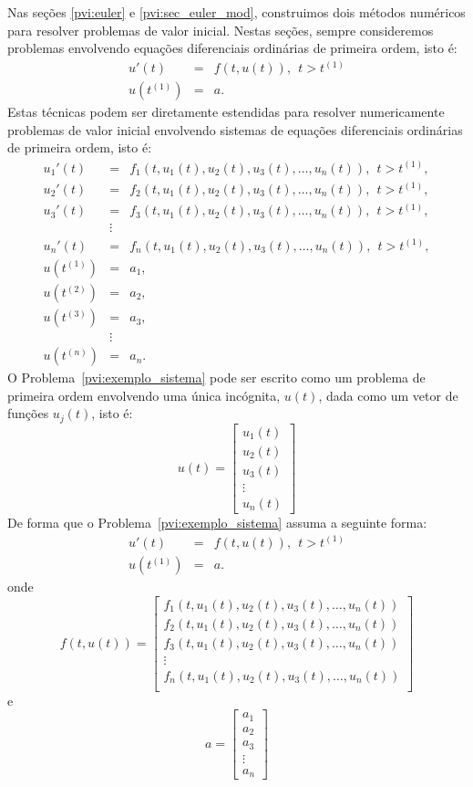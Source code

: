 Nas seções \ref{pvi:euler} e \ref{pvi:sec_euler_mod}, construimos dois métodos numéricos para resolver problemas de valor inicial. Nestas seções, sempre consideremos problemas envolvendo equações diferenciais ordinárias de primeira ordem, isto é:
\begin{eqnarray*}
  u'(t)  &=& f(t,u(t)),~~t>t^{(1)} \\
  u(t^{(1)}) &=& a.
\end{eqnarray*}
Estas técnicas podem ser diretamente estendidas para resolver numericamente problemas de valor inicial envolvendo sistemas de equações diferenciais ordinárias de primeira ordem, isto é:
\begin{eqnarray}\label{pvi:exemplo_sistema}
  u_1'(t)  &=& f_1(t,u_1(t), u_2(t), u_3(t),\ldots, u_n(t)),~~t>t^{(1)} ,\\
  u_2'(t)  &=& f_2(t,u_1(t), u_2(t), u_3(t),\ldots, u_n(t)),~~t>t^{(1)} ,\\
  u_3'(t)  &=& f_3(t,u_1(t), u_2(t), u_3(t),\ldots, u_n(t)),~~t>t^{(1)} ,\\
           &\vdots &\\
  u_n'(t)  &=& f_n(t,u_1(t), u_2(t), u_3(t),\ldots, u_n(t)),~~t>t^{(1)} ,\\
  u(t^{(1)}) &=& a_1 ,\\
  u(t^{(2)}) &=& a_2 ,\\
  u(t^{(3)}) &=& a_3 ,\\
  &\vdots&\\
  u(t^{(n)}) &=& a_n.
\end{eqnarray}
O Problema~\eqref{pvi:exemplo_sistema} pode ser escrito como um problema de primeira ordem envolvendo uma única incógnita, $u(t)$, dada como um vetor de funções $u_j(t)$, isto é:
$$u(t)=\left[
\begin{array}{c}
 u_1(t)\\
 u_2(t)\\
 u_3(t)\\
 \vdots\\
 u_n(t)
\end{array}
\right]$$
De forma que o Problema~\eqref{pvi:exemplo_sistema} assuma a seguinte forma:
\begin{eqnarray*}
  u'(t)  &=& f(t,u(t)),~~t>t^{(1)} \\
  u(t^{(1)}) &=& a.
\end{eqnarray*}
onde
$$f(t,u(t))=\left[
\begin{array}{c}
  f_1(t,u_1(t), u_2(t), u_3(t),\ldots, u_n(t))\\
  f_2(t,u_1(t), u_2(t), u_3(t),\ldots, u_n(t))\\
  f_3(t,u_1(t), u_2(t), u_3(t),\ldots, u_n(t))\\  
  \vdots\\
  f_n(t,u_1(t), u_2(t), u_3(t),\ldots, u_n(t))\\
  \end{array}
\right]$$
e
$$a=\left[
\begin{array}{c}
 a_1\\
 a_2\\
 a_3\\
 \vdots\\
 a_n
\end{array}
\right]$$

